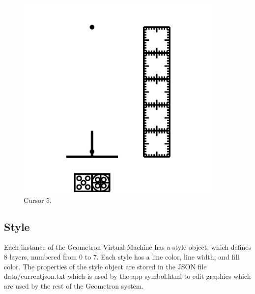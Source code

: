 \begin{figure}
	\centering
	\includegraphics[width=4in]{figures/web2d/cursor5.png}
	\caption[cursor5]
	{Cursor 5.}
\end{figure}


\subsection{Style}

Each instance of the Geometron Virtual Machine has a style object, which defines 8 layers, numbered from 0 to 7.  Each style has a line color, line width, and fill color.  The properties of the style object are stored in the JSON file data/currentjson.txt which is used by the app symbol.html to edit graphics which are used by the rest of the Geometron system.  

